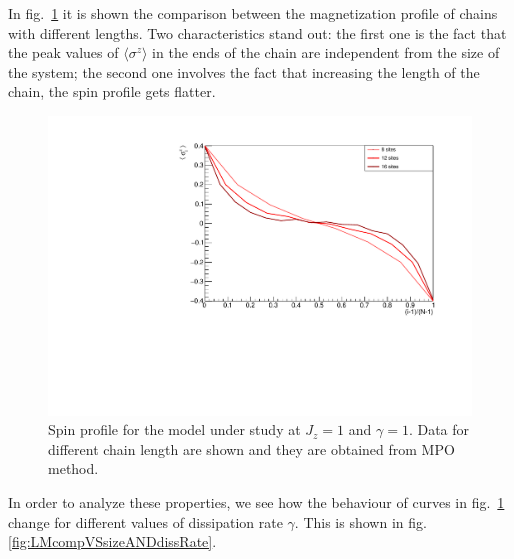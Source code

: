 In fig.~\ref{fig:LM_comparisonVSsizeJz1Gamma1} it is shown the comparison between the magnetization profile of chains with different lengths. Two characteristics stand out: the first one is the fact that the peak values of $\langle\sigma^z\rangle$ in the ends of the chain are independent from the size of the system; the second one involves the fact that increasing the length of the chain, the spin profile gets flatter.

\begin{figure}[H]
    \centering
    \includegraphics[scale=0.7]{Figures/NORM_LM_comparisonVSsize.pdf}
    \caption{Spin profile for the model under study at $J_z = 1$ and $\gamma=1$. Data for different chain length are shown and they are obtained from MPO method.}
    \label{fig:LM_comparisonVSsizeJz1Gamma1}
\end{figure}

In order to analyze these properties, we see how the behaviour of curves in fig.~\ref{fig:LM_comparisonVSsizeJz1Gamma1} change for different values of dissipation rate $\gamma$. This is shown in fig.\ref{fig:LMcompVSsizeANDdissRate}.

